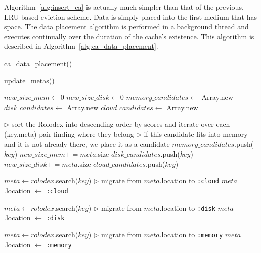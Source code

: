 Algorithm~\ref{alg:insert_ca} is actually much simpler than that of the
previous, LRU-based eviction scheme. Data is simply placed into the first
medium that has space. The data placement algorithm is performed in a
background thread and executes continually over the duration of the cache's
existence.  This algorithm is described in
Algorithm~\ref{alg:ca_data_placement}.

\begin{algorithm}[htp]
\small
\caption{\label{alg:ca_data_placement}ca\_data\_placement()}
\begin{algorithmic}[1]
	\STATE update\_metas()

	\STATE $new\_size\_mem \leftarrow 0$
	\STATE $new\_size\_disk \leftarrow 0$
	\STATE $memory\_candidates \leftarrow$ Array.new
	\STATE $disk\_candidates \leftarrow$ Array.new
	\STATE $cloud\_candidates \leftarrow$ Array.new

	\STATE $\triangleright$ sort the Rolodex into descending order by scores and
	iterate over each (key,meta) pair finding where they belong
		\STATE $\triangleright$ if this candidate fits into memory and it is not
		already there, we place it as a candidate
				\STATE $memory\_candidates$.push($key$)
			\ENDIF
			\STATE $new\_size\_mem += meta$.size
				\STATE $disk\_candidates$.push($key$)
			\ENDIF
			\STATE $new\_size\_disk += meta$.size
		\ELSE
				\STATE $cloud\_candidates$.push($key$)
			\ENDIF
		\ENDIF
	\ENDFOR

		\STATE $meta \leftarrow rolodex$.search($key$)
		\STATE $\triangleright$ migrate from $meta$.location to {\tt :cloud}
		\STATE $meta$.location $\leftarrow$ {\tt :cloud}
	\ENDFOR
	
		\STATE $meta \leftarrow rolodex$.search($key$)
		\STATE $\triangleright$ migrate from $meta$.location to {\tt :disk}
		\STATE $meta$.location $\leftarrow$ {\tt :disk}
	\ENDFOR

		\STATE $meta \leftarrow rolodex$.search($key$)
		\STATE $\triangleright$ migrate from $meta$.location to {\tt :memory}
		\STATE $meta$.location $\leftarrow$ {\tt :memory}
	\ENDFOR
\ENDWHILE
\end{algorithmic}
\end{algorithm}

